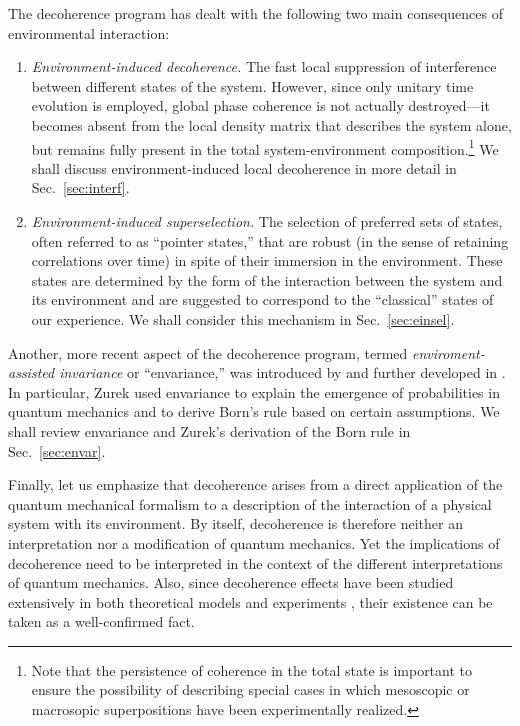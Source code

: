 \documentclass[twocolumn,rmp,aps,amsmath,amsfonts,noshowkeys,noshowpacs]{revtex4}
\begin{document}
The decoherence program has dealt with the following two main
consequences of environmental interaction:
%
\begin{enumerate}
  
\item[(1)] {\em Environment-induced decoherence.} The fast local
  suppression of interference between different states of the system.
  However, since only unitary time evolution is employed, global phase
  coherence is not actually destroyed---it becomes absent from the
  local density matrix that describes the system alone, but remains
  fully present in the total system-environment
  composition.\footnote{Note that the persistence of coherence in the
    total state is important to ensure the possibility of describing
    special cases in which mesoscopic or macrosopic superpositions have
    been experimentally realized.} We shall discuss
  environment-induced local decoherence in more detail in
  Sec.~\ref{sec:interf}.
  
\item[(2)] {\em Environment-induced superselection.} The selection of
  preferred sets of states, often referred to as ``pointer states,''
  that are robust (in the sense of retaining correlations over time)
  in spite of their immersion in the environment. These states are
  determined by the form of the interaction between the system and its
  environment and are suggested to correspond to the ``classical''
  states of our experience. We shall consider this mechanism in
  Sec.~\ref{sec:einsel}.

\end{enumerate}
%
Another, more recent aspect of the decoherence program, termed
\emph{enviroment-assisted invariance} or ``envariance,'' was
introduced by \citet{Zurek:2002:ii,Zurek:2003:rv,Zurek:2003:pl} and
further developed in \citet{Zurek:2004:yb}.  In particular, Zurek used
envariance to explain the emergence of probabilities in quantum
mechanics and to derive Born's rule based on certain assumptions. We
shall review envariance and Zurek's derivation of the Born rule in
Sec.~\ref{sec:envar}.

Finally, let us emphasize that decoherence arises from a direct
application of the quantum mechanical formalism to a description of
the interaction of a physical system with its environment. By itself,
decoherence is therefore neither an interpretation nor a modification
of quantum mechanics.  Yet the implications of decoherence need to be
interpreted in the context of the different interpretations of quantum
mechanics.  Also, since decoherence effects have been studied
extensively in both theoretical models and experiments \citep[for a
survey, see, for example,][]{Joos:2003:jh,Zurek:2002:ii}, their
existence can be taken as a well-confirmed fact.
\end{document}
